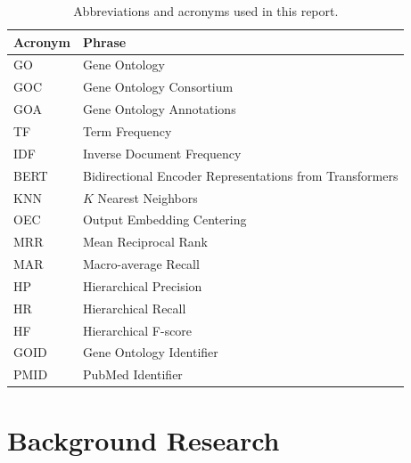\documentclass[11pt]{article}
\theoremstyle{plain}
\theoremstyle{definition}
\begin{document}
\begin{table}[H]
    \centering
    \begin{tabular}{| m{5em} | m{25em} |}
        \hline
        Acronym & Phrase                                                  \\
        \hline
        \hline
        GO      & Gene Ontology                                           \\
        \hline
        GOC     & Gene Ontology Consortium                                \\
        \hline
        GOA     & Gene Ontology Annotations                               \\
        \hline
        TF      & Term Frequency                                          \\
        \hline
        IDF     & Inverse Document Frequency                              \\
        \hline
        BERT    & Bidirectional Encoder Representations from Transformers \\
        \hline
        KNN     & $K$ Nearest Neighbors                                   \\
        \hline
        OEC     & Output Embedding Centering                              \\
        \hline
        MRR     & Mean Reciprocal Rank                                    \\
        \hline
        MAR     & Macro-average Recall                                    \\
        \hline
        HP      & Hierarchical Precision                                  \\
        \hline
        HR      & Hierarchical Recall                                     \\
        \hline
        HF      & Hierarchical F-score                                    \\
        \hline
        GOID    & Gene Ontology Identifier                                \\
        \hline
        PMID    & PubMed Identifier                                       \\
        \hline
    \end{tabular}
    \caption{Abbreviations and acronyms used in this report.}\label{tab:acronyms}
\end{table}

\section{Background Research}\label{sec:background}
\end{document}
